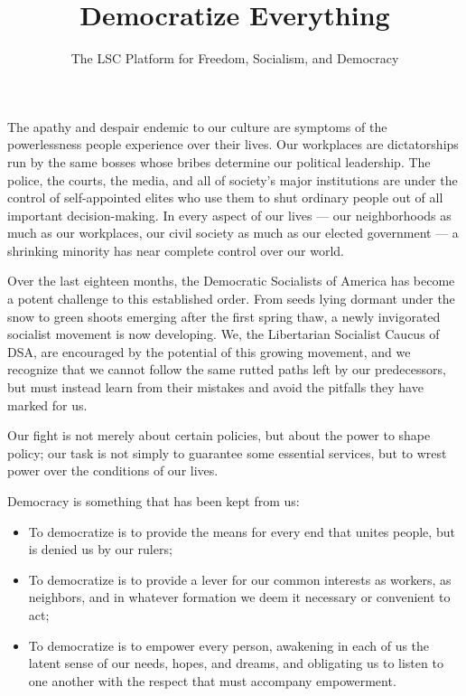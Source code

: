 \documentclass[10pt]{memoir}
\title{Democratize Everything}
\author{The LSC Platform for Freedom, Socialism, and Democracy}
\begin{document}
The apathy and despair endemic to our culture are symptoms of the powerlessness people experience over their lives. Our workplaces are dictatorships run by the same bosses whose bribes determine our political leadership. The police, the courts, the media, and all of society's major institutions are under the control of self-appointed elites who use them to shut ordinary people out of all important decision-making. In every aspect of our lives --- our neighborhoods as much as our workplaces, our civil society as much as our elected government --- a shrinking minority has near complete control over our world.

Over the last eighteen months, the Democratic Socialists of America has become a potent challenge to this established order. From seeds lying dormant under the snow to green shoots emerging after the first spring thaw, a newly invigorated socialist movement is now developing. We, the Libertarian Socialist Caucus of DSA, are encouraged by the potential of this growing movement, and we recognize that we cannot follow the same rutted paths left by our predecessors, but must instead learn from their mistakes and avoid the pitfalls they have marked for us.

Our fight is not merely about certain policies, but about the power to shape policy; our task is not simply to guarantee some essential services, but to wrest power over the conditions of our lives. 

Democracy is something that has been kept from us: 
\begin{itemize}
\item[]{To democratize is to provide the means for every end that unites people, but is denied us by our rulers;}
\item[]{To democratize is to provide a lever for our common interests as workers, as neighbors, and in whatever formation we deem it necessary or convenient to act;}
\item[]{To democratize is to empower every person, awakening in each of us the latent sense of our needs, hopes, and dreams, and obligating us to listen to one another with the respect that must accompany empowerment.}
\end{itemize}
\end{document}
